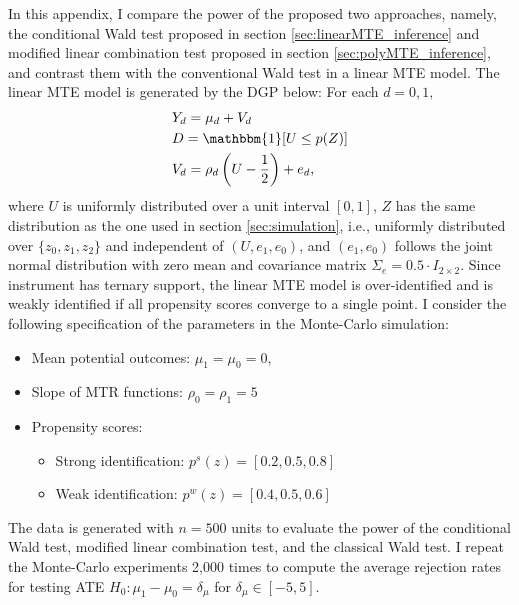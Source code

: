 \documentclass[11pt]{article}
\theoremstyle{definition}
\newcommand{\0}{\ensuremath{\mathbf{0}}}
\newcommand{\indicator}{\ensuremath{\mathbbm{1}}}
\begin{document}
\begin{bibunit}
\label{appendix:add_simulation}

In this appendix, I compare the power of the proposed two approaches, namely, the conditional Wald test proposed in section \ref{sec:linearMTE_inference} and modified linear combination test proposed in section \ref{sec:polyMTE_inference}, and contrast them with the conventional Wald test in a linear MTE model. The linear MTE model is generated by the DGP below: For each $d = 0,1,$
\begin{align*}
    & Y_d = \mu_d + V_d \\
    & D = \indicator[U \leq p(Z)] \\
    & V_d = \rho_{d}\left(U-\frac{1}{2}\right) + e_d,
\end{align*}
where $U$ is uniformly distributed over a unit interval $[0,1]$, $Z$ has the same distribution as the one used in section \ref{sec:simulation}, i.e., uniformly distributed over $\{z_0,z_1,z_2\}$ and independent of $(U,e_1,e_0)$, and $(e_1, e_0)$ follows the joint normal distribution with zero mean and covariance matrix $\Sigma_e = 0.5\cdot I_{2\times 2}$. Since instrument has ternary support, the linear MTE model is over-identified and is weakly identified if all propensity scores converge to a single point. I consider the following specification of the parameters in the Monte-Carlo simulation:
\begin{itemize}
    \item Mean potential outcomes: $\mu_1 = \mu_0 = 0$,
    \item Slope of MTR functions: $\rho_{0} = \rho_{1} = 5$
    \item Propensity scores: 
    \begin{itemize}
        \item[(i)] Strong identification: $p^s(z) = [0.2,0.5,0.8]$
        \item[(ii)] Weak identification: $p^w(z) = [0.4,0.5,0.6]$
    \end{itemize}
\end{itemize}
The data is generated with $n = 500$ units to evaluate the power of the conditional Wald test, modified linear combination test, and the classical Wald test. I repeat the Monte-Carlo experiments 2,000 times to compute the average rejection rates for testing ATE $H_0: \mu_1 - \mu_0 = \delta_\mu$ for $\delta_\mu \in [-5,5]$.


\end{bibunit}
\end{document}
